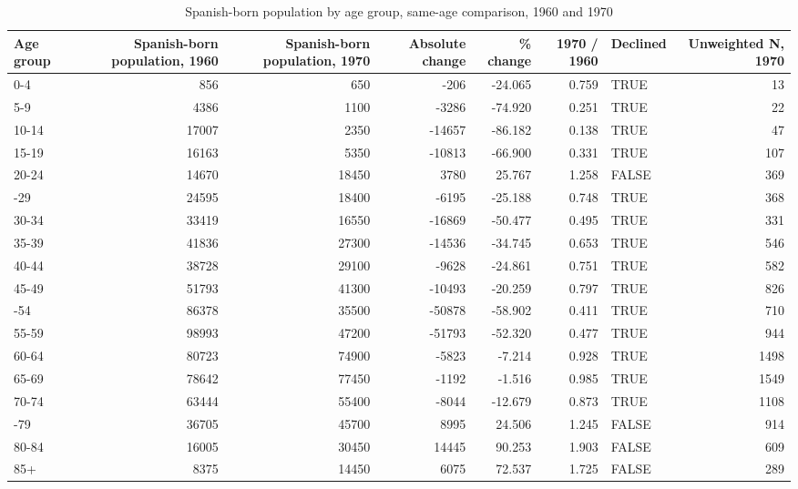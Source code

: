 \begin{table}

\caption{Spanish-born population by age group, same-age comparison, 1960 and 1970}
\centering
\begin{tabular}[t]{lrrrrrlr}
\toprule
Age group & Spanish-born population, 1960 & Spanish-born population, 1970 & Absolute change & \% change & 1970 / 1960 & Declined & Unweighted N, 1970\\
\midrule
0-4 & 856 & 650 & -206 & -24.065 & 0.759 & TRUE & 13\\
5-9 & 4386 & 1100 & -3286 & -74.920 & 0.251 & TRUE & 22\\
10-14 & 17007 & 2350 & -14657 & -86.182 & 0.138 & TRUE & 47\\
15-19 & 16163 & 5350 & -10813 & -66.900 & 0.331 & TRUE & 107\\
20-24 & 14670 & 18450 & 3780 & 25.767 & 1.258 & FALSE & 369\\
\addlinespace
25-29 & 24595 & 18400 & -6195 & -25.188 & 0.748 & TRUE & 368\\
30-34 & 33419 & 16550 & -16869 & -50.477 & 0.495 & TRUE & 331\\
35-39 & 41836 & 27300 & -14536 & -34.745 & 0.653 & TRUE & 546\\
40-44 & 38728 & 29100 & -9628 & -24.861 & 0.751 & TRUE & 582\\
45-49 & 51793 & 41300 & -10493 & -20.259 & 0.797 & TRUE & 826\\
\addlinespace
50-54 & 86378 & 35500 & -50878 & -58.902 & 0.411 & TRUE & 710\\
55-59 & 98993 & 47200 & -51793 & -52.320 & 0.477 & TRUE & 944\\
60-64 & 80723 & 74900 & -5823 & -7.214 & 0.928 & TRUE & 1498\\
65-69 & 78642 & 77450 & -1192 & -1.516 & 0.985 & TRUE & 1549\\
70-74 & 63444 & 55400 & -8044 & -12.679 & 0.873 & TRUE & 1108\\
\addlinespace
75-79 & 36705 & 45700 & 8995 & 24.506 & 1.245 & FALSE & 914\\
80-84 & 16005 & 30450 & 14445 & 90.253 & 1.903 & FALSE & 609\\
85+ & 8375 & 14450 & 6075 & 72.537 & 1.725 & FALSE & 289\\
\bottomrule
\end{tabular}
\end{table}
